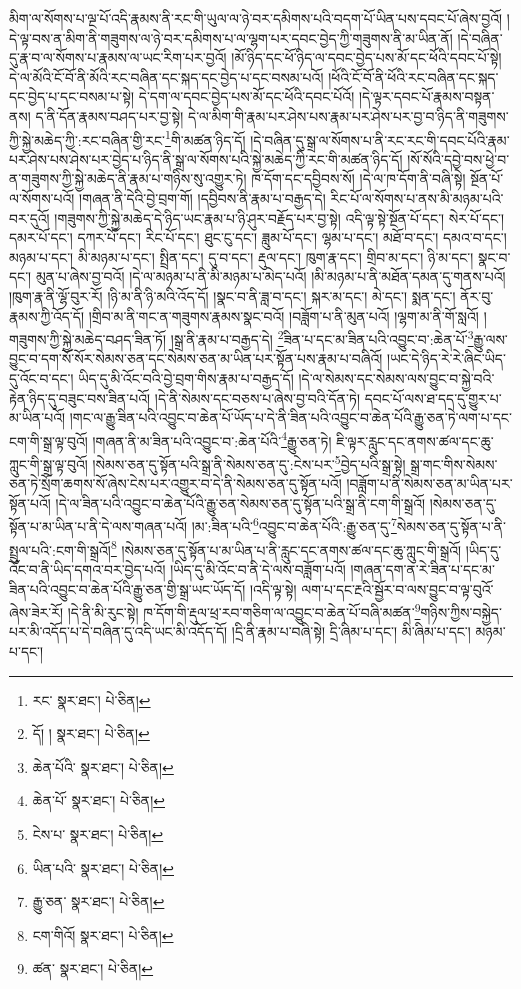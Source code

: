 མིག་ལ་སོགས་པ་ལྔ་པོ་འདི་རྣམས་ནི་རང་གི་ཡུལ་ལ་ཉེ་བར་དམིགས་པའི་བདག་པོ་ཡིན་པས་དབང་པོ་ཞེས་བྱའོ། །དེ་ལྟ་བས་ན་མིག་ནི་གཟུགས་ལ་ཉེ་བར་དམིགས་པ་ལ་ལྷག་པར་དབང་བྱེད་ཀྱི་གཟུགས་ནི་མ་ཡིན་ནོ། །དེ་བཞིན་དུ་རྣ་བ་ལ་སོགས་པ་རྣམས་ལ་ཡང་རིག་པར་བྱའོ། །མོ་ཉིད་དང་ཕོ་ཉིད་ལ་དབང་བྱེད་པས་མོ་དང་ཕོའི་དབང་པོ་སྟེ། དེ་ལ་མོའི་ངོ་བོ་ནི་མོའི་རང་བཞིན་དང་སྐད་དང་བྱེད་པ་དང་བསམ་པའོ། །ཕོའི་ངོ་བོ་ནི་ཕོའི་རང་བཞིན་དང་སྐད་དང་བྱེད་པ་དང་བསམ་པ་སྟེ། དེ་དག་ལ་དབང་བྱེད་པས་མོ་དང་ཕོའི་དབང་པོའོ། །དེ་ལྟར་དབང་པོ་རྣམས་བསྟན་ནས། ད་ནི་དོན་རྣམས་བཤད་པར་བྱ་སྟེ། དེ་ལ་མིག་གི་རྣམ་པར་ཤེས་པས་རྣམ་པར་ཤེས་པར་བྱ་བ་ཉིད་ནི་གཟུགས་ཀྱི་སྐྱེ་མཆེད་ཀྱི་:རང་བཞིན་གྱི་རང་\footnote{རང་  སྣར་ཐང་།  པེ་ཅིན། }གི་མཚན་ཉིད་དོ། །དེ་བཞིན་དུ་སྒྲ་ལ་སོགས་པ་ནི་རང་རང་གི་དབང་པོའི་རྣམ་པར་ཤེས་པས་ཤེས་པར་བྱེད་པ་ཉིད་ནི་སྒྲ་ལ་སོགས་པའི་སྐྱེ་མཆེད་ཀྱི་རང་གི་མཚན་ཉིད་དོ། །སོ་སོའི་དབྱེ་བས་ཕྱེ་བ་ན་གཟུགས་ཀྱི་སྐྱེ་མཆེད་ནི་རྣམ་པ་གཉིས་སུ་འགྱུར་ཏེ། ཁ་དོག་དང་དབྱིབས་སོ། །དེ་ལ་ཁ་དོག་ནི་བཞི་སྟེ། སྔོན་པོ་ལ་སོགས་པའོ། །གཞན་ནི་དེའི་བྱེ་བྲག་གོ། །དབྱིབས་ནི་རྣམ་པ་བརྒྱད་དེ། རིང་པོ་ལ་སོགས་པ་ནས་མི་མཉམ་པའི་བར་དུའོ། །གཟུགས་ཀྱི་སྐྱེ་མཆེད་དེ་ཉིད་ཡང་རྣམ་པ་ཉི་ཤུར་བརྗོད་པར་བྱ་སྟེ། འདི་ལྟ་སྟེ་སྔོན་པོ་དང་། སེར་པོ་དང་། དམར་པོ་དང་། དཀར་པོ་དང་། རིང་པོ་དང་། ཐུང་ངུ་དང་། ཟླུམ་པོ་དང་། ལྷམ་པ་དང་། མཐོ་བ་དང་། དམའ་བ་དང་། མཉམ་པ་དང་། མི་མཉམ་པ་དང་། སྤྲིན་དང་། དུ་བ་དང་། རྡུལ་དང་། ཁུག་རྣ་དང་། གྲིབ་མ་དང་། ཉི་མ་དང་། སྣང་བ་དང་། མུན་པ་ཞེས་བྱ་བའོ། །དེ་ལ་མཉམ་པ་ནི་མི་མཉམ་པ་མེད་པའོ། །མི་མཉམ་པ་ནི་མཐོན་དམན་དུ་གནས་པའོ། །ཁུག་རྣ་ནི་ལྷོ་བུར་རོ། །ཉི་མ་ནི་ཉི་མའི་འོད་དོ། །སྣང་བ་ནི་ཟླ་བ་དང་། སྐར་མ་དང་། མེ་དང་། སྨན་དང་། ནོར་བུ་རྣམས་ཀྱི་འོད་དོ། །གྲིབ་མ་ནི་གང་ན་གཟུགས་རྣམས་སྣང་བའོ། །བཟློག་པ་ནི་མུན་པའོ། །ལྷག་མ་ནི་གོ་སླའོ། །གཟུགས་ཀྱི་སྐྱེ་མཆེད་བཤད་ཟིན་ཏོ། །སྒྲ་ནི་རྣམ་པ་བརྒྱད་དེ། \footnote{དོ། །   སྣར་ཐང་།  པེ་ཅིན། }ཟིན་པ་དང་མ་ཟིན་པའི་འབྱུང་བ་:ཆེན་པོ་\footnote{ཆེན་པོའི་  སྣར་ཐང་།  པེ་ཅིན། }རྒྱུ་ལས་བྱུང་བ་དག་སོ་སོར་སེམས་ཅན་དང་སེམས་ཅན་མ་ཡིན་པར་སྟོན་པས་རྣམ་པ་བཞིའོ། །ཡང་དེ་ཉིད་རེ་རེ་ཞིང་ཡིད་དུ་འོང་བ་དང་། ཡིད་དུ་མི་འོང་བའི་བྱེ་བྲག་གིས་རྣམ་པ་བརྒྱད་དོ། །དེ་ལ་སེམས་དང་སེམས་ལས་བྱུང་བ་སྐྱེ་བའི་རྟེན་ཉིད་དུ་བཟུང་བས་ཟིན་པའོ། །དེ་ནི་སེམས་དང་བཅས་པ་ཞེས་བྱ་བའི་དོན་ཏེ། དབང་པོ་ལས་ཐ་དད་དུ་གྱུར་པ་མ་ཡིན་པའོ། །གང་ལ་རྒྱུ་ཟིན་པའི་འབྱུང་བ་ཆེན་པོ་ཡོད་པ་དེ་ནི་ཟིན་པའི་འབྱུང་བ་ཆེན་པོའི་རྒྱུ་ཅན་ཏེ་ལག་པ་དང་ངག་གི་སྒྲ་ལྟ་བུའོ། །གཞན་ནི་མ་ཟིན་པའི་འབྱུང་བ་:ཆེན་པོའི་\footnote{ཆེན་པོ་  སྣར་ཐང་།  པེ་ཅིན། }རྒྱུ་ཅན་ཏེ། ཇི་ལྟར་རླུང་དང་ནགས་ཚལ་དང་ཆུ་ཀླུང་གི་སྒྲ་ལྟ་བུའོ། །སེམས་ཅན་དུ་སྟོན་པའི་སྒྲ་ནི་སེམས་ཅན་དུ་:ངེས་པར་\footnote{ངེས་པ་  སྣར་ཐང་།  པེ་ཅིན། }བྱེད་པའི་སྒྲ་སྟེ། སྒྲ་གང་གིས་སེམས་ཅན་ཏེ་སྲོག་ཆགས་སོ་ཞེས་ངེས་པར་འགྱུར་བ་དེ་ནི་སེམས་ཅན་དུ་སྟོན་པའོ། །བཟློག་པ་ནི་སེམས་ཅན་མ་ཡིན་པར་སྟོན་པའོ། །དེ་ལ་ཟིན་པའི་འབྱུང་བ་ཆེན་པོའི་རྒྱུ་ཅན་སེམས་ཅན་དུ་སྟོན་པའི་སྒྲ་ནི་ངག་གི་སྒྲའོ། །སེམས་ཅན་དུ་སྟོན་པ་མ་ཡིན་པ་ནི་དེ་ལས་གཞན་པའོ། །མ་:ཟིན་པའི་\footnote{ཡིན་པའི་  སྣར་ཐང་།  པེ་ཅིན། }འབྱུང་བ་ཆེན་པོའི་:རྒྱུ་ཅན་དུ་\footnote{རྒྱུ་ཅན་  སྣར་ཐང་།  པེ་ཅིན། }སེམས་ཅན་དུ་སྟོན་པ་ནི་སྤྲུལ་པའི་:ངག་གི་སྒྲའོ།\footnote{ངག་གིའོ།  སྣར་ཐང་།  པེ་ཅིན། } །སེམས་ཅན་དུ་སྟོན་པ་མ་ཡིན་པ་ནི་རླུང་དང་ནགས་ཚལ་དང་ཆུ་ཀླུང་གི་སྒྲའོ། །ཡིད་དུ་འོང་བ་ནི་ཡིད་དགའ་བར་བྱེད་པའོ། །ཡིད་དུ་མི་འོང་བ་ནི་དེ་ལས་བཟློག་པའོ། །གཞན་དག་ན་རེ་ཟིན་པ་དང་མ་ཟིན་པའི་འབྱུང་བ་ཆེན་པོའི་རྒྱུ་ཅན་གྱི་སྒྲ་ཡང་ཡོད་དོ། །འདི་ལྟ་སྟེ། ལག་པ་དང་རྔའི་སྦྱོར་བ་ལས་བྱུང་བ་ལྟ་བུའོ་ཞེས་ཟེར་རོ། །དེ་ནི་མི་རུང་སྟེ། ཁ་དོག་གི་རྡུལ་ཕྲ་རབ་གཅིག་ལ་འབྱུང་བ་ཆེན་པོ་བཞི་མཚན་\footnote{ཚན་  སྣར་ཐང་།  པེ་ཅིན། }གཉིས་ཀྱིས་བསྐྱེད་པར་མི་འདོད་པ་དེ་བཞིན་དུ་འདི་ཡང་མི་འདོད་དོ། །དྲི་ནི་རྣམ་པ་བཞི་སྟེ། དྲི་ཞིམ་པ་དང་། མི་ཞིམ་པ་དང་། མཉམ་པ་དང་། 